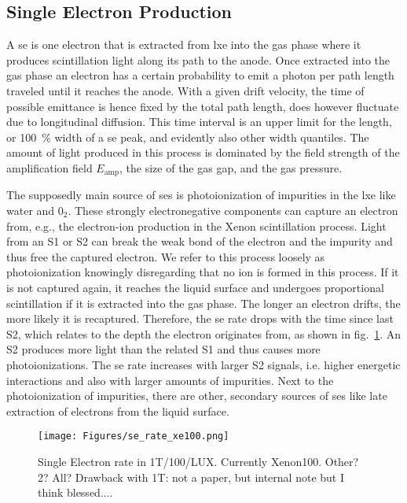 
\FloatBarrier
\subsection{Single Electron Production}
\label{ssec:se-source}
\FloatBarrier


A \gls{se} is one electron that is extracted from \gls{lxe} into the gas phase where it produces scintillation light along its path to the anode.
Once extracted into the gas phase an electron has a certain probability to emit a photon per path length traveled until it reaches the anode. %
With a given drift velocity, the time of possible emittance is hence fixed by the total path length, does however fluctuate due to longitudinal diffusion.
This time interval is an upper limit for the length, or \SI{100}{\%} width of a \gls{se} peak, and evidently also other width quantiles.
The amount of light produced in this process is dominated by the field strength of the amplification field $ E_\mathrm{amp} $, the size of the gas gap, and the gas pressure.

The supposedly main source of \glspl{se} is photoionization of impurities in the \gls{lxe} like water and $ 0_2 $.
These strongly electronegative components can capture an electron from, e.g., the electron-ion production in the Xenon scintillation process.
Light from an S1 or S2 can break the weak bond of the electron and the impurity and thus free the captured electron.
We refer to this process loosely as photoionization knowingly disregarding that no ion is formed in this process.
If it is not captured again, it reaches the liquid surface and undergoes proportional scintillation if it is extracted into the gas phase.
The longer an electron drifts, the more likely it is recaptured.
Therefore, the \gls{se} rate drops with the time since last S2, which relates to the depth the electron originates from, as shown in fig.~\ref{fig:se-rate-xe100}.  %
An S2 produces more light than the related S1 and thus causes more photoionizations.
The \gls{se} rate increases with larger S2 signals, i.e. higher energetic interactions and also with larger amounts of impurities\cite{?}.  %
Next to the photoionization of impurities, there are other, secondary sources of \glspl{se} like late extraction of electrons from the liquid surface.


\begin{figure}
    \centering
    \texttt{[image: Figures/se\_rate\_xe100.png]}  %
    \caption[Single Electron Rate in 1T/100/LUX]{
        Single Electron rate in 1T/100/LUX. Currently Xenon100. Other? 2? All? Drawback with 1T: not a paper, but internal note but I think blessed...\cite{Aprile2014}.
    }
    \label{fig:se-rate-xe100}
\end{figure}

